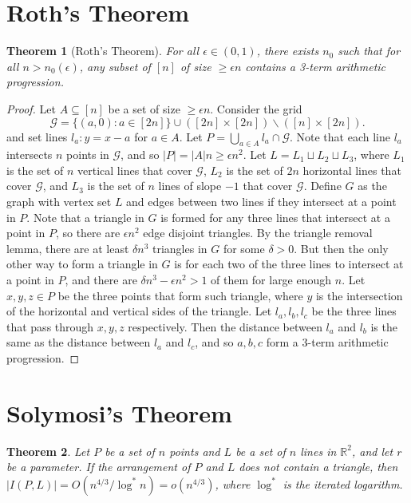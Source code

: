 \documentclass[12pt,reqno]{amsart}
\newtheorem{theorem}{Theorem}[section]
\theoremstyle{definition}
\theoremstyle{remark}
\renewcommand{\geq}{\geqslant}
\def\R{\mathbb{R}}
\numberwithin{equation}{section}
\begin{document}
\newpage

\section{Roth's Theorem}

\begin{theorem}[Roth's Theorem]
	For all $\epsilon \in (0, 1)$, there exists $n_0$ such that for all $n > n_0(\epsilon)$, any subset of $[n]$ of size $\geq \epsilon n$ contains a 3-term arithmetic progression.
\end{theorem}

\begin{proof}
	Let $A \subseteq [n]$ be a set of size $\geq \epsilon n$. Consider the grid
	\[
		\mathscr{G} = \{(a, 0) : a \in [2n]\} \cup ([2n] \times [2n]) \backslash ([n] \times [2n]).
	\]
	and set lines $l_a : y = x - a$ for $a \in A$. Let $P = \bigcup_{a \in A} l_a \cap \mathscr{G}$. Note that each line $l_a$ intersects $n$ points in $\mathscr{G}$, and so $|P| = |A|n \geq \epsilon n^2$. Let $L = L_1 \sqcup L_2 \sqcup L_3$, where $L_1$ is the set of $n$ vertical lines that cover $\mathscr{G}$, $L_2$ is the set of $2n$ horizontal lines that cover $\mathscr{G}$, and $L_3$ is the set of $n$ lines of slope $-1$ that cover $\mathscr{G}$. Define $G$ as the graph with vertex set $L$ and edges between two lines if they intersect at a point in $P$. Note that a triangle in $G$ is formed for any three lines that intersect at a point in $P$, so there are $\epsilon n^2$ edge disjoint triangles. By the triangle removal lemma, there are at least $\delta n^3$ triangles in $G$ for some $\delta > 0$. But then the only other way to form a triangle in $G$ is for each two of the three lines to intersect at a point in $P$, and there are $\delta n^3 - \epsilon n^2 > 1$ of them for large enough $n$. Let $x, y, z \in P$ be the three points that form such triangle, where $y$ is the intersection of the horizontal and vertical sides of the triangle. Let $l_a, l_b, l_c$ be the three lines that pass through $x, y, z$ respectively. Then the distance between $l_a$ and $l_b$ is the same as the distance between $l_a$ and $l_c$, and so $a, b, c$ form a 3-term arithmetic progression. 
\end{proof}

\newpage

\section{Solymosi's Theorem}

\begin{theorem}
	Let $P$ be a set of $n$ points and $L$ be a set of $n$ lines in $\R^2$, and let $r$ be a parameter. If the arrangement of $P$ and $L$ does not contain a triangle, then $|I(P, L)| = O(n^{4/3}/\log^* n) = o(n^{4/3})$, where $\log^*$ is the iterated logarithm. 
\end{theorem}
\end{document}
